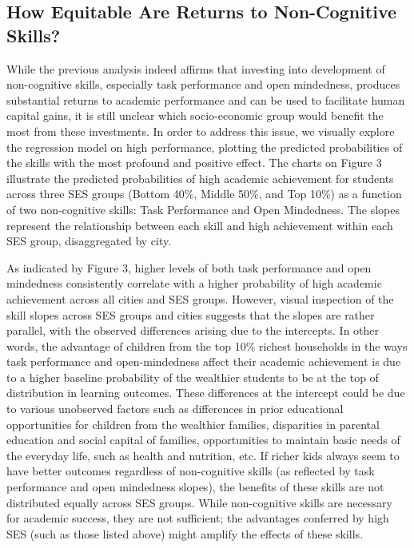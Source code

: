 \documentclass{article}
\begin{document}
\hypertarget{how-equitable-are-returns-to-non-cognitive-skills}{%
\subsection{How Equitable Are Returns to Non-Cognitive
Skills?}\label{how-equitable-are-returns-to-non-cognitive-skills}}

While the previous analysis indeed affirms that investing into
development of non-cognitive skills, especially task performance and
open mindedness, produces substantial returns to academic performance
and can be used to facilitate human capital gains, it is still unclear
which socio-economic group would benefit the most from these
investments. In order to address this issue, we visually explore the
regression model on high performance, plotting the predicted
probabilities of the skills with the most profound and positive effect.
The charts on Figure 3 illustrate the predicted probabilities of high
academic achievement for students across three SES groups (Bottom 40\%,
Middle 50\%, and Top 10\%) as a function of two non-cognitive skills:
Task Performance and Open Mindedness. The slopes represent the
relationship between each skill and high achievement within each SES
group, disaggregated by city.

As indicated by Figure 3, higher levels of both task performance and
open mindedness consistently correlate with a higher probability of high
academic achievement across all cities and SES groups. However, visual
inspection of the skill slopes across SES groups and cities suggests
that the slopes are rather parallel, with the observed differences
arising due to the intercepts. In other words, the advantage of children
from the top 10\% richest households in the ways task performance and
open-mindedness affect their academic achievement is due to a higher
baseline probability of the wealthier students to be at the top of
distribution in learning outcomes. These differences at the intercept
could be due to various unobserved factors such as differences in prior
educational opportunities for children from the wealthier families,
disparities in parental education and social capital of families,
opportunities to maintain basic needs of the everyday life, such as
health and nutrition, etc. If richer kids always seem to have better
outcomes regardless of non-cognitive skills (as reflected by task
performance and open mindedness slopes), the benefits of these skills
are not distributed equally across SES groups. While non-cognitive
skills are necessary for academic success, they are not sufficient; the
advantages conferred by high SES (such as those listed above) might
amplify the effects of these skills.
\end{document}

